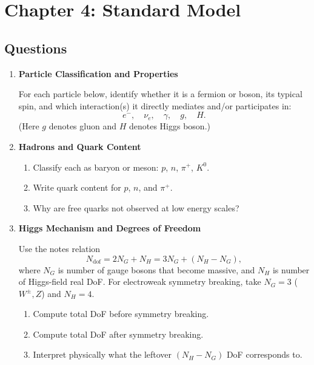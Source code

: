 \clearpage
\section{Chapter 4: Standard Model}

\subsection{Questions}

\begin{enumerate}[label=4.\arabic*]
  \item \label{q:4.1} \textbf{Particle Classification and Properties}

  For each particle below, identify whether it is a fermion or boson, its typical spin, and which interaction(s) it directly mediates and/or participates in:
  \[
    e^-,\quad \nu_e,\quad \gamma,\quad g,\quad H.
  \]
  (Here $g$ denotes gluon and $H$ denotes Higgs boson.)

  \item \label{q:4.2} \textbf{Hadrons and Quark Content}

  \begin{enumerate}[label=(\alph*)]
    \item Classify each as baryon or meson: $p$, $n$, $\pi^+$, $K^0$.
    \item Write quark content for $p$, $n$, and $\pi^+$.
    \item Why are free quarks not observed at low energy scales?
  \end{enumerate}

  \item \label{q:4.3} \textbf{Higgs Mechanism and Degrees of Freedom}

  Use the notes relation
  \[
    N_{\mathrm{dof}} = 2N_G + N_H = 3N_G + (N_H-N_G),
  \]
  where $N_G$ is number of gauge bosons that become massive, and $N_H$ is number of Higgs-field real DoF.
  For electroweak symmetry breaking, take $N_G=3$ ($W^\pm,Z$) and $N_H=4$.
  \begin{enumerate}[label=(\alph*)]
    \item Compute total DoF before symmetry breaking.
    \item Compute total DoF after symmetry breaking.
    \item Interpret physically what the leftover $(N_H-N_G)$ DoF corresponds to.
  \end{enumerate}
\end{enumerate}

\bigskip
\bigskip
\bigskip

